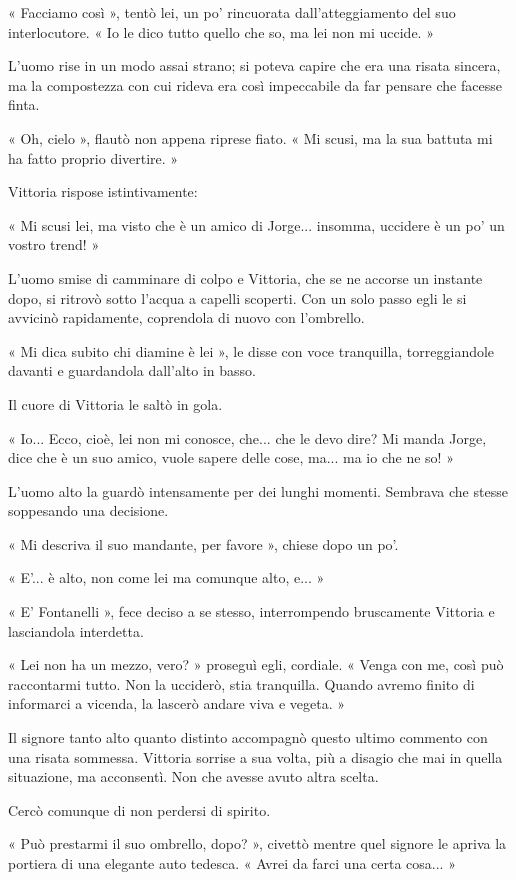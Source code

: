 « Facciamo così », tentò lei, un po' rincuorata dall'atteggiamento del suo interlocutore. « Io le dico tutto quello che so, ma lei non mi uccide. »

L'uomo rise in un modo assai strano; si poteva capire che era una risata sincera, ma la compostezza con cui rideva era così impeccabile da far pensare che facesse finta.

« Oh, cielo », flautò non appena riprese fiato. « Mi scusi, ma la sua battuta mi ha fatto proprio divertire. »

Vittoria rispose istintivamente:

« Mi scusi lei, ma visto che è un amico di Jorge... insomma, uccidere è un po' un vostro trend! »

L'uomo smise di camminare di colpo e Vittoria, che se ne accorse un instante dopo, si ritrovò sotto l'acqua a capelli scoperti. Con un solo passo egli le si avvicinò rapidamente, coprendola di nuovo con l'ombrello.

« Mi dica subito chi diamine è lei », le disse con voce tranquilla, torreggiandole davanti e guardandola dall'alto in basso.

Il cuore di Vittoria le saltò in gola.

« Io... Ecco, cioè, lei non mi conosce, che... che le devo dire? Mi manda Jorge, dice che è un suo amico, vuole sapere delle cose, ma... ma io che ne so! »

L'uomo alto la guardò intensamente per dei lunghi momenti. Sembrava che stesse soppesando una decisione.

« Mi descriva il suo mandante, per favore », chiese dopo un po'.

« E'... è alto, non come lei ma comunque alto, e... »

« E' Fontanelli », fece deciso a se stesso, interrompendo bruscamente Vittoria e lasciandola interdetta.

« Lei non ha un mezzo, vero? » proseguì egli, cordiale. « Venga con me, così può raccontarmi tutto. Non la ucciderò, stia tranquilla. Quando avremo finito di informarci a vicenda, la lascerò andare viva e vegeta. »

Il signore tanto alto quanto distinto accompagnò questo ultimo commento con una risata sommessa. Vittoria sorrise a sua volta, più a disagio che mai in quella situazione, ma acconsentì. Non che avesse avuto altra scelta.

Cercò comunque di non perdersi di spirito.

« Può prestarmi il suo ombrello, dopo? », civettò mentre quel signore le apriva la portiera di una elegante auto tedesca. « Avrei da farci una certa cosa... »

